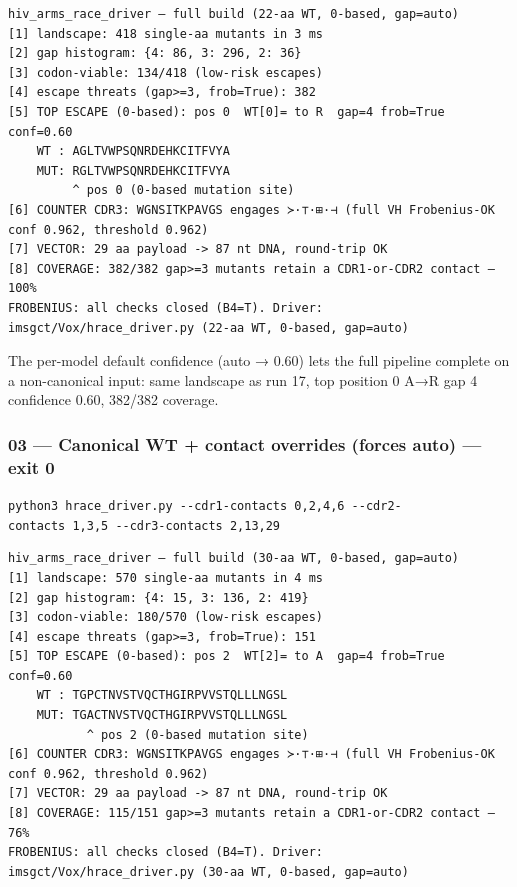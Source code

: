 \begin{verbatim}
hiv_arms_race_driver — full build (22-aa WT, 0-based, gap=auto)
[1] landscape: 418 single-aa mutants in 3 ms
[2] gap histogram: {4: 86, 3: 296, 2: 36}
[3] codon-viable: 134/418 (low-risk escapes)
[4] escape threats (gap>=3, frob=True): 382
[5] TOP ESCAPE (0-based): pos 0  WT[0]= to R  gap=4 frob=True conf=0.60
    WT : AGLTVWPSQNRDEHKCITFVYA
    MUT: RGLTVWPSQNRDEHKCITFVYA
         ^ pos 0 (0-based mutation site)
[6] COUNTER CDR3: WGNSITKPAVGS engages ≻·⊤·⊞·⊣ (full VH Frobenius-OK conf 0.962, threshold 0.962)
[7] VECTOR: 29 aa payload -> 87 nt DNA, round-trip OK
[8] COVERAGE: 382/382 gap>=3 mutants retain a CDR1-or-CDR2 contact — 100%
FROBENIUS: all checks closed (B4=T). Driver: imsgct/Vox/hrace_driver.py (22-aa WT, 0-based, gap=auto)
\end{verbatim}

The per-model default confidence (auto → 0.60) lets the full pipeline
complete on a non-canonical input: same landscape as run 17, top
position 0 A→R gap 4 confidence 0.60, 382/382 coverage.

\hypertarget{canonical-wt-contact-overrides-forces-auto-exit-0}{%
\subsubsection{03 --- Canonical WT + contact overrides (forces auto) ---
exit 0}\label{canonical-wt-contact-overrides-forces-auto-exit-0}}

\texttt{python3\ hrace\_driver.py\ -\/-cdr1-contacts\ 0,2,4,6\ -\/-cdr2-contacts\ 1,3,5\ -\/-cdr3-contacts\ 2,13,29}

\begin{verbatim}
hiv_arms_race_driver — full build (30-aa WT, 0-based, gap=auto)
[1] landscape: 570 single-aa mutants in 4 ms
[2] gap histogram: {4: 15, 3: 136, 2: 419}
[3] codon-viable: 180/570 (low-risk escapes)
[4] escape threats (gap>=3, frob=True): 151
[5] TOP ESCAPE (0-based): pos 2  WT[2]= to A  gap=4 frob=True conf=0.60
    WT : TGPCTNVSTVQCTHGIRPVVSTQLLLNGSL
    MUT: TGACTNVSTVQCTHGIRPVVSTQLLLNGSL
           ^ pos 2 (0-based mutation site)
[6] COUNTER CDR3: WGNSITKPAVGS engages ≻·⊤·⊞·⊣ (full VH Frobenius-OK conf 0.962, threshold 0.962)
[7] VECTOR: 29 aa payload -> 87 nt DNA, round-trip OK
[8] COVERAGE: 115/151 gap>=3 mutants retain a CDR1-or-CDR2 contact — 76%
FROBENIUS: all checks closed (B4=T). Driver: imsgct/Vox/hrace_driver.py (30-aa WT, 0-based, gap=auto)
\end{verbatim}

